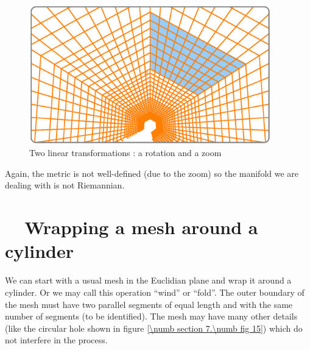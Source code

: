 \begin{figure}[ht] \centering
  \includegraphics[width=105mm]{sector-3.eps}
  \caption{Two linear transformations : a rotation and a zoom}
  \label{\numb section 7.\numb fig 14}
\end{figure}

Again, the metric is not well-defined (due to the zoom)
so the manifold we are dealing with is not Riemannian.


\section{~~Wrapping a mesh around a cylinder}\label{\numb section 7.\numb parag 19}

We can start with a usual mesh in the Euclidian plane and wrap it around a cylinder.
Or we may call this operation ``wind'' or ``fold''.
The outer boundary of the mesh must have two parallel segments of equal length and with
the same number of segments (to be identified).
The mesh may have many other details (like the circular hole shown in figure
\ref{\numb section 7.\numb fig 15}) which do not interfere in the process.

